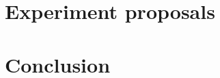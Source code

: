 \documentclass[]{article}
\begin{document}
\section{Experiment proposals}


\section{Conclusion}
\end{document}
